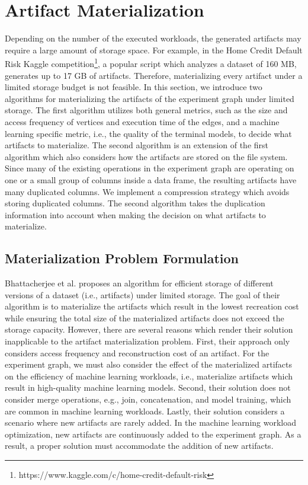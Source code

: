 \section{Artifact Materialization}\label{sec-materialization}
Depending on the number of the executed workloads, the generated artifacts may require a large amount of storage space.
For example, in the Home Credit Default Risk Kaggle competition\footnote{https://www.kaggle.com/c/home-credit-default-risk}, a popular script which analyzes a dataset of 160 MB, generates up to 17 GB of artifacts.
Therefore, materializing every artifact under a limited storage budget is not feasible.
In this section, we introduce two algorithms for materializing the artifacts of the experiment graph under limited storage.
The first algorithm utilizes both general metrics, such as the size and access frequency of vertices and execution time of the edges, and a machine learning specific metric, i.e., the quality of the terminal models, to decide what artifacts to materialize.
The second algorithm is an extension of the first algorithm which also considers how the artifacts are stored on the file system.
Since many of the existing operations in the experiment graph are operating on one or a small group of columns inside a data frame, the resulting artifacts have many duplicated columns.
We implement a compression strategy which avoids storing duplicated columns.
The second algorithm takes the duplication information into account when making the decision on what artifacts to materialize.

\subsection{Materialization Problem Formulation}\label{subsec-materialization-problem}
Bhattacherjee et al. \cite{bhattacherjee2015principles} proposes an algorithm for efficient storage of different versions of a dataset (i.e., artifacts) under limited storage.
The goal of their algorithm is to materialize the artifacts which result in the lowest recreation cost while ensuring the total size of the materialized artifacts does not exceed the storage capacity.
However, there are several reasons which render their solution inapplicable to the artifact materialization problem.
First, their approach only considers access frequency and reconstruction cost of an artifact.
For the experiment graph, we must also consider the effect of the materialized artifacts on the efficiency of machine learning workloads, i.e., materialize artifacts which result in high-quality machine learning models.
Second, their solution does not consider merge operations, e.g., join, concatenation, and model training, which are common in machine learning workloads.
Lastly, their solution considers a scenario where new artifacts are rarely added.
In the machine learning workload optimization, new artifacts are continuously added to the experiment graph.
As a result, a proper solution must accommodate the addition of new artifacts.

